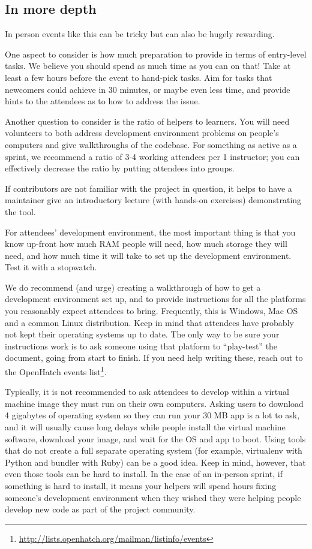 \subsection{In more depth}
In person events like this can be tricky but can also be hugely rewarding.

One aspect to consider is how much preparation to provide in terms of entry-level tasks. We believe you should spend as much time as you can on that! Take at least a few hours before the event to hand-pick tasks. Aim for tasks that newcomers could achieve in 30 minutes, or maybe even less time, and provide hints to the attendees as to how to address the issue.

Another question to consider is the ratio of helpers to learners. You will need volunteers to both address development environment problems on people’s computers and give walkthroughs of the codebase. For something as active as a sprint, we recommend a ratio of 3-4 working attendees per 1 instructor; you can effectively decrease the ratio by putting attendees into groups.

If contributors are not familiar with the project in question, it helps to have a maintainer give an introductory lecture (with hands-on exercises) demonstrating the tool.

For attendees’ development environment, the most important thing is that you know up-front how much RAM people will need, how much storage they will need, and how much time it will take to set up the development environment. Test it with a stopwatch.

We do recommend (and urge) creating a walkthrough of how to get a development environment set up, and to provide instructions for all the platforms you reasonably expect attendees to bring. Frequently, this is Windows, Mac OS and a common Linux distribution. Keep in mind that attendees have probably not kept their operating systems up to date. The only way to be sure your instructions work is to ask someone using that platform to “play-test” the document, going from start to finish. If you need help writing these, reach out to the OpenHatch events list\footnote{\url{http://lists.openhatch.org/mailman/listinfo/events}}.

Typically, it is not recommended to ask attendees to develop within a virtual machine image they must run on their own computers. Asking users to download 4 gigabytes of operating system so they can run your 30 MB app is a lot to ask, and it will usually cause long delays while people install the virtual machine software, download your image, and wait for the OS and app to boot. Using tools that do not create a full separate operating system (for example, virtualenv with Python and bundler with Ruby) can be a good idea. Keep in mind, however, that even those tools can be hard to install. In the case of an in-person sprint, if something is hard to install, it means your helpers will spend hours fixing someone’s development environment when they wished they were helping people develop new code as part of the project community.


